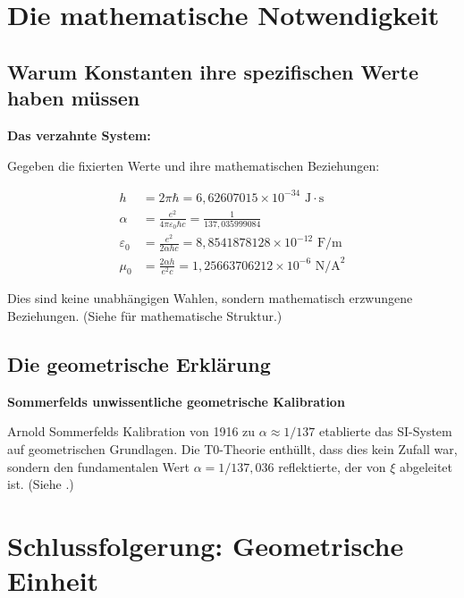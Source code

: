 	\section{Die mathematische Notwendigkeit}
	
	\subsection{Warum Konstanten ihre spezifischen Werte haben müssen}
	
	\begin{derivation}
		\textbf{Das verzahnte System:}
		
		Gegeben die fixierten Werte und ihre mathematischen Beziehungen:
		
		\begin{align}
			h &= 2\pi\hbar = 6{,}62607015 \times 10^{-34} \text{ J}\cdot\text{s} \\
			\alpha &= \frac{e^2}{4\pi\varepsilon_0\hbar c} = \frac{1}{137{,}035999084} \\
			\varepsilon_0 &= \frac{e^2}{2\alpha h c} = 8{,}8541878128 \times 10^{-12} \text{ F/m} \\
			\mu_0 &= \frac{2\alpha h}{e^2 c} = 1{,}25663706212 \times 10^{-6} \text{ N/A}^2
		\end{align}
		
		Dies sind keine unabhängigen Wahlen, sondern mathematisch erzwungene Beziehungen. (Siehe \cite{Mathematische_struktur_De} für mathematische Struktur.)
	\end{derivation}
	
	\subsection{Die geometrische Erklärung}
	
	\begin{historical}
		\textbf{Sommerfelds unwissentliche geometrische Kalibration}
		
		Arnold Sommerfelds Kalibration von 1916 zu $\alpha \approx 1/137$ etablierte das SI-System auf geometrischen Grundlagen. Die T0-Theorie enthüllt, dass dies kein Zufall war, sondern den fundamentalen Wert $\alpha = 1/137{,}036$ reflektierte, der von $\xi$ abgeleitet ist. (Siehe \cite{137_De}.)
	\end{historical}
	
	\section{Schlussfolgerung: Geometrische Einheit}
	
